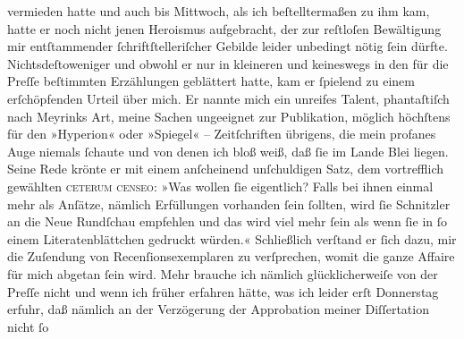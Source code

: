 \begin{ledgroupsized}[t]{13cm}
                    vermieden hatte und auch bis Mittwoch, als ich beſtelltermaßen zu
                    ihm kam, hatte er noch nicht jenen Heroismus aufgebracht, der zur reſtloſen
                    Bewältigung mir entſtammender ſchriftſtelleriſcher Gebilde leider unbedingt
                    nötig ſein dürfte. Nichtsdeſtoweniger und obwohl er nur in kleineren und
                    keineswegs in den für die Preſſe beſtimmten
                    Erzählungen geblättert hatte, kam er ſpielend zu einem erſchöpfenden Urteil über
                    mich. Er nannte mich ein unreifes Talent, phantaſtiſch nach Meyrinks Art, meine Sachen ungeeignet zur Publikation,
                    möglich höchſtens für den »Hyperion« oder »Spiegel« – Zeitſchriften {\pb}übrigens, die mein profanes Auge niemals ſchaute und
                    von denen ich bloß weiß, daß ſie im Lande Blei liegen. Seine Rede krönte er mit einem anſcheinend unſchuldigen
                    Satz, dem vortrefflich gewählten \textsc{ceterum censeo}: »Was
                    wollen ſie eigentlich? Falls bei ihnen einmal mehr als Anſätze, nämlich
                    Erfüllungen vorhanden ſein ſollten, wird ſie Schnitzler an die Neue Rundſchau empfehlen und das wird viel mehr ſein als
                    wenn ſie in ſo einem Literatenblättchen gedruckt würden.« Schließlich verſtand
                    er ſich dazu, mir die Zuſendung von Recenſionsexemplaren zu verſprechen, womit
                    die ganze Affaire für mich abgetan ſein wird. Mehr brauche ich nämlich
                    glücklicherweiſe von der Preſſe nicht und wenn
                    ich früher erfahren hätte, was ich leider erſt Donnerstag erfuhr,
                    daß nämlich an der Verzögerung der Approbation {\pb}meiner
                        Diſſertation nicht ſo

\end{ledgroupsized}
